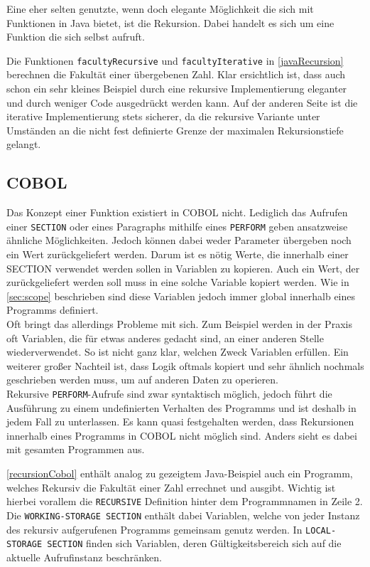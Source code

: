 Eine eher selten genutzte, wenn doch elegante Möglichkeit die sich mit Funktionen in Java bietet, ist die Rekursion. Dabei handelt es sich um eine Funktion die sich selbst aufruft. \\


Die Funktionen \texttt{facultyRecursive} und \texttt{facultyIterative} in \autoref{javaRecursion} berechnen  die Fakultät einer übergebenen Zahl. Klar ersichtlich ist, dass auch schon ein sehr kleines Beispiel durch eine rekursive Implementierung eleganter und durch weniger Code ausgedrückt werden kann. Auf der anderen Seite ist die iterative Implementierung stets sicherer, da die rekursive Variante unter Umständen an die nicht fest definierte Grenze der maximalen Rekursionstiefe gelangt.\\

\subsection*{COBOL}
Das Konzept einer Funktion existiert in COBOL nicht. Lediglich das Aufrufen einer \texttt{SECTION} oder eines Paragraphs mithilfe eines \texttt{PERFORM} geben ansatzweise ähnliche Möglichkeiten. Jedoch können dabei weder Parameter übergeben noch ein Wert zurückgeliefert werden. Darum ist es nötig Werte, die innerhalb einer SECTION verwendet werden sollen in Variablen zu kopieren. Auch ein Wert, der zurückgeliefert werden soll muss in eine solche Variable kopiert werden. Wie in \autoref{sec:scope} beschrieben sind diese Variablen jedoch immer global innerhalb eines Programms definiert.\\

Oft bringt das allerdings Probleme mit sich. Zum Beispiel werden in der Praxis oft Variablen, die für etwas anderes gedacht sind, an einer anderen Stelle wiederverwendet. So ist nicht ganz klar, welchen Zweck Variablen erfüllen. Ein weiterer großer Nachteil ist, dass Logik oftmals kopiert und sehr ähnlich nochmals geschrieben werden muss, um auf anderen Daten zu operieren.\\

Rekursive \texttt{PERFORM}-Aufrufe sind zwar syntaktisch möglich, jedoch führt die Ausführung zu einem undefinierten Verhalten des Programms und ist deshalb in jedem Fall zu unterlassen. Es kann quasi festgehalten werden, dass Rekursionen innerhalb eines Programms in COBOL nicht möglich sind. Anders sieht es dabei mit gesamten Programmen aus.


\autoref{recursionCobol} enthält analog zu gezeigtem Java-Beispiel auch ein Programm, welches Rekursiv die Fakultät einer Zahl errechnet und ausgibt. Wichtig ist hierbei vorallem die \texttt{RECURSIVE} Definition hinter dem Programmnamen in Zeile 2. Die \texttt{WORKING-STORAGE SECTION} enthält dabei Variablen, welche von jeder Instanz des rekursiv aufgerufenen Programms gemeinsam genutz werden. In \texttt{LOCAL-STORAGE SECTION} finden sich Variablen, deren Gültigkeitsbereich sich auf die aktuelle Aufrufinstanz beschränken.